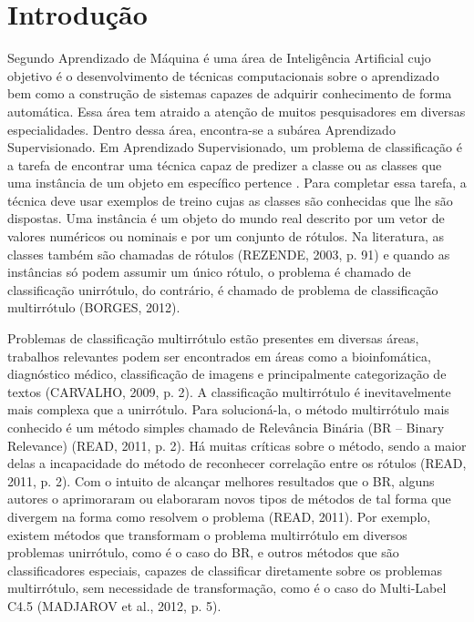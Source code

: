 \newcommand{\NbasesV}{\textit{N}}
\newcommand{\Nbases}{6}
\newcommand{\Nml}{6}
\newcommand{\NmlT}{5}
\newcommand{\NmlA}{2}
\newcommand{\Ncb}{4}
\newcommand{\MML}{método multirrótulo}
\newcommand{\MMLs}{métodos multirrótulo}
\newcommand{\MRLM}{Recursive Dependent Binary Relevance}
\newcommand{\MRLMa}{RDBR}

\newcommand{\legendaTab}[2]{Desempenho dos métodos multirrótulos com \textit{#2} medido pela métrica \textit{#1} }
\newcommand{\jqo}{J48}
\newcommand{\EBA}{Example Based Accuracy}
\newcommand{\SA}{\textit{Subset Accuracy}}
\newcommand{\HL}{\textit{Hamming Loss}}
\newcommand{\CC}{\textit{Classifier Chain}}
\newcommand{\ECC}{\textit{Ensemble of }~\CC}

\chapter{Introdução}
Segundo \cite{rezende2003sistemas} Aprendizado de Máquina é uma área de Inteligência Artificial
cujo objetivo é o desenvolvimento de técnicas computacionais
sobre o aprendizado bem como a construção de sistemas capazes de adquirir
conhecimento de forma automática. Essa área tem atraido a atenção de muitos 
pesquisadores em diversas especialidades. Dentro dessa área, encontra-se a subárea Aprendizado Supervisionado.
Em Aprendizado Supervisionado, um problema de classificação é a tarefa de encontrar
uma técnica capaz de predizer a classe ou as classes que uma instância de
um objeto em específico pertence \cite{rezende2003sistemas}.
Para completar essa tarefa, a técnica deve usar exemplos de treino cujas as classes
são conhecidas que lhe são dispostas. Uma instância é um objeto do mundo real descrito
por um vetor de valores numéricos ou nominais e por um conjunto de rótulos.
Na literatura, as classes também são chamadas de rótulos (REZENDE, 2003, p. 91)
e quando as instâncias só podem assumir um único rótulo, o problema é chamado de classificação unirrótulo,
do contrário, é chamado de problema de classificação multirrótulo (BORGES, 2012).

Problemas de classificação multirrótulo estão presentes em diversas áreas, trabalhos relevantes podem
ser encontrados em áreas como a bioinfomática, diagnóstico médico, classificação de imagens e principalmente
categorização de textos (CARVALHO, 2009, p. 2). A classificação multirrótulo é inevitavelmente
mais complexa que a unirrótulo. Para solucioná-la,  o método multirrótulo mais conhecido é um método simples chamado de
Relevância Binária (BR – Binary Relevance) (READ, 2011, p. 2). 
Há muitas críticas sobre o método, sendo a maior delas a incapacidade do método de reconhecer correlação entre os rótulos (READ, 2011, p. 2).
Com o intuito de alcançar melhores resultados que o BR, alguns autores o aprimoraram ou elaboraram novos tipos de métodos
de tal forma que divergem na forma como resolvem o problema (READ, 2011). 
Por exemplo, existem métodos que transformam o problema multirrótulo em
diversos problemas unirrótulo, como é o caso do BR, e outros métodos que são classificadores especiais, capazes de classificar diretamente sobre os problemas multirrótulo, sem necessidade de transformação, como é o caso do Multi-Label C4.5 (MADJAROV et al., 2012, p. 5). 

